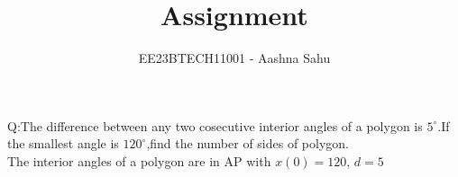 \documentclass[journal,12pt,twocolumn]{IEEEtran}
\theoremstyle{remark}
\begin{document}
\let\vec\mathbf



\vspace{3cm}
\title{Assignment}
\author{EE23BTECH11001 - Aashna Sahu}
\maketitle
\newpage
\bigskip

\renewcommand{\thefigure}{\theenumi}
\renewcommand{\thetable}{\theenumi}
Q:The difference between any two cosecutive interior angles of a polygon is $5^\circ$.If the smallest angle is $120^\circ$,find the number of sides of polygon.
\\\solution
The interior angles of a polygon are in AP with
    $x(0)=120$, $d=5$
\end{document}
